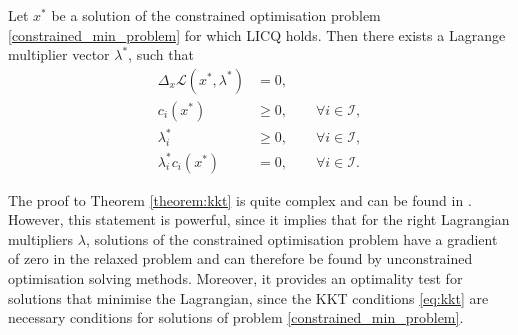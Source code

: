 \begin{theorem}$\,$\\
	\label{theorem:kkt}
Let $x^*$ be a solution of the constrained optimisation problem \eqref{constrained_min_problem} for which LICQ holds. Then there exists a Lagrange multiplier vector $\lambda^*$, such that
\begin{subequations}
	\label{eq:kkt}
	\begin{align}
	\Delta_x \mathcal{L}(x^*, \lambda^*) &= 0,\\
	c_i(x^*) &\geq 0, \qquad \forall i \in \mathcal{I},\\
	\lambda^*_i &\geq 0, \qquad \forall i \in \mathcal{I},\\
	\lambda^*_i  c_i(x^*) &= 0, \qquad \forall i \in \mathcal{I}.
	\end{align}
\end{subequations}
\end{theorem}

The proof to Theorem \ref{theorem:kkt} is quite complex and can be found in \cite{NoceWrig06}. However, this statement is powerful, since it implies that for the right Lagrangian multipliers $\lambda$, solutions of the constrained optimisation problem have a gradient of zero in the relaxed problem and can therefore be found by unconstrained optimisation solving methods. Moreover, it provides an optimality test for solutions that minimise the Lagrangian, since the KKT conditions \eqref{eq:kkt} are necessary conditions for solutions of problem \eqref{constrained_min_problem}.\\




